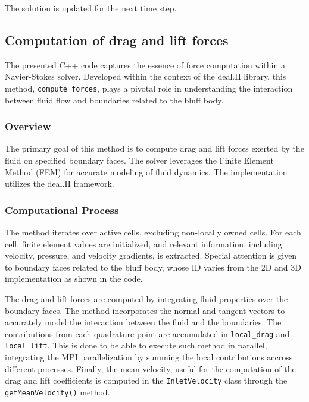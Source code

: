 \documentclass{article}
\begin{document}
The solution is updated for the next time step.

\subsection{Computation of drag and lift forces}

The presented C++ code captures the essence of force computation within a Navier-Stokes solver. Developed within the context of the deal.II library, this method, \texttt{compute\_forces}, plays a pivotal role in understanding the interaction between fluid flow and boundaries related to the bluff body.

\subsubsection{Overview}

The primary goal of this method is to compute drag and lift forces exerted by the fluid on specified boundary faces. The solver leverages the Finite Element Method (FEM) for accurate modeling of fluid dynamics. The implementation utilizes the deal.II framework.

\subsubsection{Computational Process}

The method iterates over active cells, excluding non-locally owned cells. For each cell, finite element values are initialized, and relevant information, including velocity, pressure, and velocity gradients, is extracted. Special attention is given to boundary faces related to the bluff body, whose ID varies from the 2D and 3D implementation as shown in the code.

The drag and lift forces are computed by integrating fluid properties over the boundary faces. The method incorporates the normal and tangent vectors to accurately model the interaction between the fluid and the boundaries. The contributions from each quadrature point are accumulated in \texttt{local\_drag} and \texttt{local\_lift}. This is done to be able to execute such method in parallel, integrating the MPI parallelization by summing the local contributions accross different processes.
Finally, the mean velocity, useful for the computation of the drag and lift coefficients is computed in the \texttt{InletVelocity} class through the \texttt{getMeanVelocity()} method.

\newpage
\end{document}
